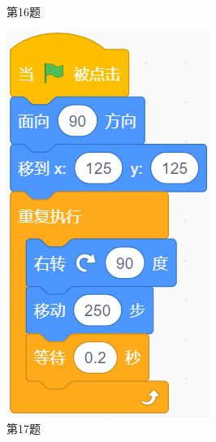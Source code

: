 \documentclass[10pt, a4paper]{article}
\begin{document}
\begin{enumerate}
\begin{figure}[htbp]
\begin{minipage}[t]{.15\textwidth}
                \caption*{第16题}
            \end{minipage}
            \begin{minipage}[t]{.1\textwidth}
                \centering
                \includegraphics[width=\textwidth]{17.png}
                \caption*{第17题}
            \end{minipage}
        \end{figure}


\end{enumerate}
\end{document}
